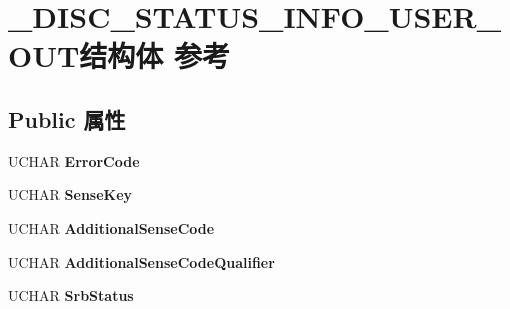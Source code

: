 \hypertarget{struct___d_i_s_c___s_t_a_t_u_s___i_n_f_o___u_s_e_r___o_u_t}{}\section{\+\_\+\+D\+I\+S\+C\+\_\+\+S\+T\+A\+T\+U\+S\+\_\+\+I\+N\+F\+O\+\_\+\+U\+S\+E\+R\+\_\+\+O\+U\+T结构体 参考}
\label{struct___d_i_s_c___s_t_a_t_u_s___i_n_f_o___u_s_e_r___o_u_t}
\subsection*{Public 属性}
\begin{DoxyCompactItemize}
\item 
\mbox{\label{struct___d_i_s_c___s_t_a_t_u_s___i_n_f_o___u_s_e_r___o_u_t_a10121902630b563bf02c155e683a83e4}} 
U\+C\+H\+AR {\bfseries Error\+Code}
\item 
\mbox{\label{struct___d_i_s_c___s_t_a_t_u_s___i_n_f_o___u_s_e_r___o_u_t_a90bae99f7a1282a90aa86b5fc2a6158f}} 
U\+C\+H\+AR {\bfseries Sense\+Key}
\item 
\mbox{\label{struct___d_i_s_c___s_t_a_t_u_s___i_n_f_o___u_s_e_r___o_u_t_aca05fd6c86448e9b03f3e812e8f49ee3}} 
U\+C\+H\+AR {\bfseries Additional\+Sense\+Code}
\item 
\mbox{\label{struct___d_i_s_c___s_t_a_t_u_s___i_n_f_o___u_s_e_r___o_u_t_acd9841e26e89bdd8ec5290972b5945ea}} 
U\+C\+H\+AR {\bfseries Additional\+Sense\+Code\+Qualifier}
\item 
\mbox{\label{struct___d_i_s_c___s_t_a_t_u_s___i_n_f_o___u_s_e_r___o_u_t_ab2556fc04c0e1deb05dd9759845f0e1b}} 
U\+C\+H\+AR {\bfseries Srb\+Status}
\item 
\mbox{\label{struct___d_i_s_c___s_t_a_t_u_s___i_n_f_o___u_s_e_r___o_u_t_a80f4ab6b984c489ad18614dcfe091fe7}} 

\end{DoxyCompactItemize}
